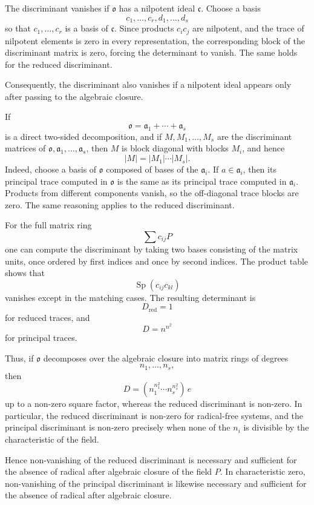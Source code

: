 \documentclass[11pt]{article}
\begin{document}
The discriminant vanishes if \(\mathfrak{o}\) has a nilpotent ideal
\(\mathfrak c\). Choose a basis \[
  c_1,\ldots,c_r,d_1,
\ldots,d_s
\] so that \(c_1,\ldots,c_r\) is a basis of \(\mathfrak c\). Since
products \(c_i c_j\) are nilpotent, and the trace of nilpotent elements
is zero in every representation, the corresponding block of the
discriminant matrix is zero, forcing the determinant to vanish. The same
holds for the reduced discriminant.

Consequently, the discriminant also vanishes if a nilpotent ideal
appears only after passing to the algebraic closure.

If \[
  \mathfrak{o}=\mathfrak a_1+
\cdots+
\mathfrak a_s
\] is a direct two-sided decomposition, and if \(M,M_1,\ldots,M_s\) are
the discriminant matrices of \(\mathfrak{o},\mathfrak a_1,
\ldots,\mathfrak a_s\), then \(M\) is block diagonal with blocks
\(M_i\), and hence \[
  |M|=|M_1|\cdots|M_s|.
\] Indeed, choose a basis of \(\mathfrak{o}\) composed of bases of the
\(\mathfrak a_i\). If \(a\in\mathfrak a_i\), then its principal trace
computed in \(\mathfrak{o}\) is the same as its principal trace computed
in \(\mathfrak a_i\). Products from different components vanish, so the
off-diagonal trace blocks are zero. The same reasoning applies to the
reduced discriminant.

For the full matrix ring \[
  \sum c_{ij}P
\] one can compute the discriminant by taking two bases consisting of
the matrix units, once ordered by first indices and once by second
indices. The product table shows that \[
  \operatorname{Sp}(c_{ij}c_{kl})
\] vanishes except in the matching cases. The resulting determinant is
\[
  D_{\mathrm{red}}=1
\] for reduced traces, and \[
  D=n^{n^2}
\] for principal traces.

Thus, if \(\mathfrak{o}\) decomposes over the algebraic closure into
matrix rings of degrees \[
  n_1,\ldots,n_s,
\] then \[
  D=(n_1^{n_1^2}\cdots n_s^{n_s^2})\,e
\] up to a non-zero square factor, whereas the reduced discriminant is
non-zero. In particular, the reduced discriminant is non-zero for
radical-free systems, and the principal discriminant is non-zero
precisely when none of the \(n_i\) is divisible by the characteristic of
the field.

Hence non-vanishing of the reduced discriminant is necessary and
sufficient for the absence of radical after algebraic closure of the
field \(P\). In characteristic zero, non-vanishing of the principal
discriminant is likewise necessary and sufficient for the absence of
radical after algebraic closure.
\end{document}
